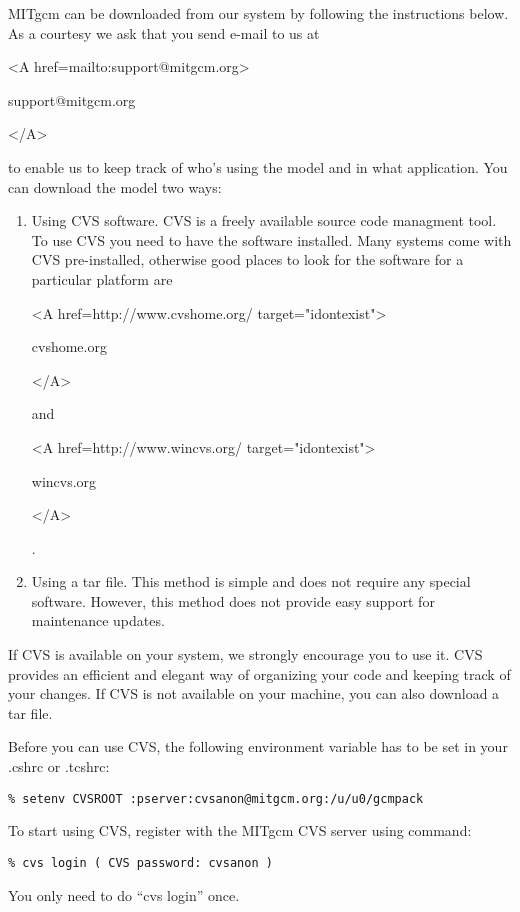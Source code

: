 MITgcm can be downloaded from our system by following
the instructions below. As a courtesy we ask that you send e-mail to us at
\begin{rawhtml} <A href=mailto:support@mitgcm.org> \end{rawhtml}
support@mitgcm.org
\begin{rawhtml} </A> \end{rawhtml}
to enable us to keep track of who's using the model and in what application.
You can download the model two ways:

\begin{enumerate}
\item Using CVS software. CVS is a freely available source code managment
tool. To use CVS you need to have the software installed. Many systems
come with CVS pre-installed, otherwise good places to look for
the software for a particular platform are
\begin{rawhtml} <A href=http://www.cvshome.org/ target="idontexist"> \end{rawhtml}
cvshome.org
\begin{rawhtml} </A> \end{rawhtml}
and
\begin{rawhtml} <A href=http://www.wincvs.org/ target="idontexist"> \end{rawhtml}
wincvs.org
\begin{rawhtml} </A> \end{rawhtml}
.

\item Using a tar file. This method is simple and does not
require any special software. However, this method does not
provide easy support for maintenance updates.

\end{enumerate}

If CVS is available on your system, we strongly encourage you to use it. CVS
provides an efficient and elegant way of organizing your code and keeping
track of your changes. If CVS is not available on your machine, you can also
download a tar file.

Before you can use CVS, the following environment variable has to be set in
your .cshrc or .tcshrc:
\begin{verbatim}
% setenv CVSROOT :pserver:cvsanon@mitgcm.org:/u/u0/gcmpack
\end{verbatim}

To start using CVS, register with the MITgcm CVS server using command:
\begin{verbatim}
% cvs login ( CVS password: cvsanon )
\end{verbatim}
You only need to do ``cvs login'' once.

